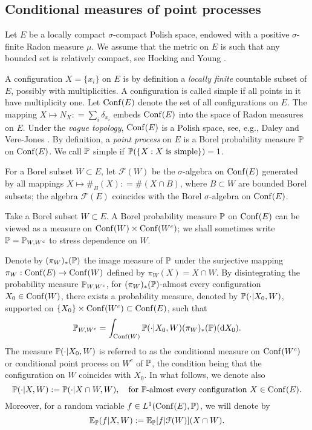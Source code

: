 \documentclass[12pt]{paper}
\numberwithin{theorem}{section}
\numberwithin{figure}{section}
\numberwithin{equation}{section}
\begin{document}
\subsection{Conditional measures of point processes}\label{sec-conditional}
Let $E$ be a locally compact   $\sigma$-compact Polish space, endowed with a positive  $\sigma$-finite Radon measure $\mu$. We assume that the metric on $E$ is such that  any bounded set  is relatively compact, see Hocking and Young \cite[Theorem 2-61]{Hocking-Young}.

 A configuration $X = \{x_i\}$ on $E$ is by definition a {\it locally finite} countable subset of $E$, possibly with multiplicities.   A configuration is called simple if all points in it have multiplicity one. Let $\mathrm{Conf}(E)$ denote  the set of all configurations on $E$. The mapping $X \mapsto N_X: = \sum_{i} \delta_{x_i}$ embeds $\mathrm{Conf}(E)$ into the space of Radon measures on $E$.  Under the {\it vague topology}, $\mathrm{Conf}(E)$  is a Polish space, see, e.g., Daley and Vere-Jones \cite[Theorem 9.1. IV]{Daley-Vere}.  By definition, a {\it point process} on $E$ is a Borel probability  measure $\mathbb{P}$ on $\mathrm{Conf}(E)$. We call $\mathbb{P}$ simple if $\mathbb{P}(\{X: \text{$X$ is simple}\}) = 1$.

For a Borel subset $W \subset E$, let $\mathcal{F}(W)$ be the $\sigma$-algebra on $\mathrm{Conf}(E)$ generated by all mappings $X \mapsto \#_B(X) : = \#(X \cap B)$, where $B \subset W$ are bounded Borel subsets; the algebra $\mathcal{F}(E)$ coincides with the Borel $\sigma$-algebra on $\mathrm{Conf}(E)$.




Take a Borel subset $W\subset E$. A Borel probability measure  $\mathbb{P}$ on  $\mathrm{Conf}(E)$ can be  viewed as a measure on $\mathrm{Conf}(W) \times \mathrm{Conf}(W^c)$; we shall sometimes write  $\mathbb{P}=\mathbb{P}_{W, W^c}$ to stress dependence on $W$.

Denote by  $(\pi_W)_{*}(\mathbb{P})$  the image measure of $\mathbb{P}$ under the surjective mapping $ \pi_W:  \mathrm{Conf}(E)  \rightarrow \mathrm{Conf}(W)$ defined by $\pi_W(X) = X\cap W$.  By  disintegrating the probability measure $\mathbb{P}_{W, W^c}$, for $(\pi_W)_{*}(\mathbb{P})$-almost every configuration $X_{0}\in \mathrm{Conf}(W)$,  there exists a probability measure, denoted by $\mathbb{P}(\cdot| X_{0}, W)$,  supported on $ \{X_{0}\} \times \mathrm{Conf}(W^c) \subset \mathrm{Conf} (E) $,  such that
\[
\mathbb{P}_{W, W^c}= \int_{\mathrm{Conf}(W)}  \mathbb{P}(\cdot| X_{0}, W)   (\pi_W)_{*}(\mathbb{P}) (  \mathrm{d}  X_{0}).
\]
The measure $\mathbb{P}(\cdot| X_{0}, W)$ is referred to as the  conditional measure on $\mathrm{Conf}(W^c)$ or conditional point process on $W^c$ of $\mathbb{P}$, the condition being that the configuration on $W$ coincides with $X_0$. In what follows, we denote also
\[
\mathbb{P} (\cdot | X, W): = \mathbb{P}(\cdot |  X\cap W, W), \quad \text{for $\mathbb{P}$-almost every configuration $X\in \mathrm{Conf}(E)$}.
\]
Moreover, for a random variable $f \in L^1( \mathrm{Conf}(E), \mathbb{P})$, we will denote by
\[
\mathbb{E}_{\mathbb{P}}(f| X, W) :=  \mathbb{E}_{\mathbb{P}} [f |  \mathcal{F}(W)](X\cap W).
\]
\end{document}
